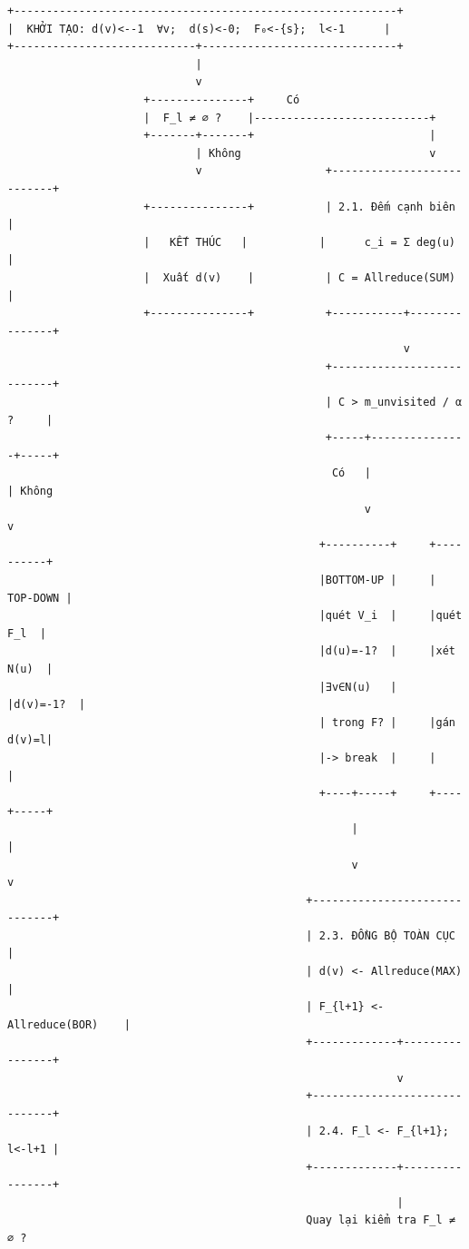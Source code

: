 \documentclass[12pt,a4paper]{article}
\begin{document}
\begin{Verbatim}[fontsize=\small]
+-----------------------------------------------------------+
|  KHỞI TẠO: d(v)<--1  ∀v;  d(s)<-0;  F₀<-{s};  l<-1      |
+----------------------------+------------------------------+
                             |
                             v
                     +---------------+     Có
                     |  F_l ≠ ∅ ?    |---------------------------+
                     +-------+-------+                           |
                             | Không                             v
                             v                   +---------------------------+
                     +---------------+           | 2.1. Đếm cạnh biên       |
                     |   KẾT THÚC   |           |      c_i = Σ deg(u)       |
                     |  Xuất d(v)    |           | C = Allreduce(SUM)        |
                     +---------------+           +-----------+---------------+
                                                             v
                                                 +---------------------------+
                                                 | C > m_unvisited / α ?     |
                                                 +-----+---------------+-----+
                                                  Có   |               | Không
                                                       v               v
                                                +----------+     +----------+
                                                |BOTTOM-UP |     | TOP-DOWN |
                                                |quét V_i  |     |quét F_l  |
                                                |d(u)=-1?  |     |xét N(u)  |
                                                |∃v∈N(u)   |     |d(v)=-1?  |
                                                | trong F? |     |gán d(v)=l|
                                                |-> break  |     |          |
                                                +----+-----+     +----+-----+
                                                     |                 |
                                                     v                 v
                                              +------------------------------+
                                              | 2.3. ĐỒNG BỘ TOÀN CỤC      |
                                              | d(v) <- Allreduce(MAX)       |
                                              | F_{l+1} <- Allreduce(BOR)    |
                                              +-------------+----------------+
                                                            v
                                              +------------------------------+
                                              | 2.4. F_l <- F_{l+1}; l<-l+1 |
                                              +-------------+----------------+
                                                            |
                                              Quay lại kiểm tra F_l ≠ ∅ ?
\end{Verbatim}
\end{document}
